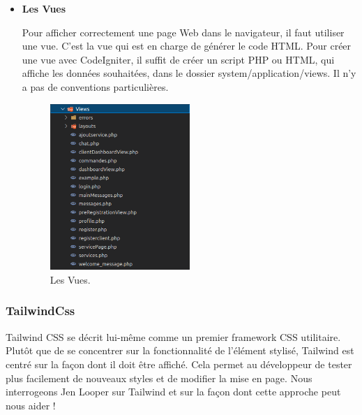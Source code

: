 \documentclass[french]{report}
\begin{document}
\begin{itemize}
            \item \textbf{Les Vues}
            
            Pour afficher correctement une page Web dans le navigateur, 
	    il faut utiliser une vue. C'est la vue qui est en charge de générer le code HTML.
	    Pour créer une vue avec CodeIgniter, il suffit de créer un script PHP ou HTML,
	    qui affiche les données souhaitées, dans le dossier system/application/views. 
	    Il n'y a pas de conventions particulières.
         
         \begin{figure}[H]
                \centering
                \includegraphics[width=0.5\textwidth]{images/viewq.png}
                \caption{Les Vues.}
                \label{fig:my_label}
            \end{figure}


        \end{itemize}
        
        \begin{description}
            \item[]
        \end{description}
        
     
        \subsubsection{TailwindCss}
        Tailwind CSS se décrit lui-même comme un premier framework CSS utilitaire.
	Plutôt que de se concentrer sur la fonctionnalité de l'élément stylisé,
	Tailwind est centré sur la façon dont il doit être affiché. Cela permet au 
	développeur de tester plus facilement de nouveaux styles et de modifier la
	mise en page. Nous interrogeons Jen Looper sur Tailwind et sur la façon dont
	cette approche peut nous aider !
        
\end{document}
